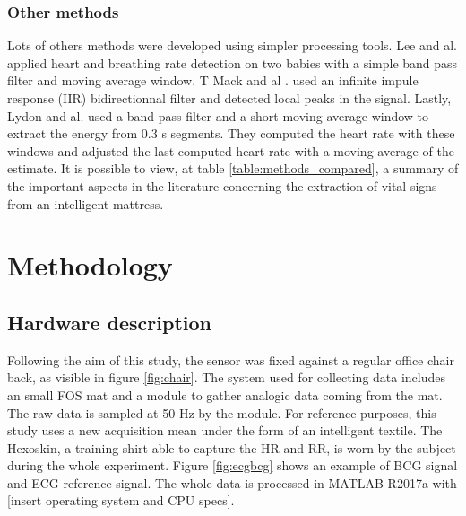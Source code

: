 \documentclass[twoside,twocolumn]{article}
\begin{document}
		\subsubsection{Other methods}
		Lots of others methods were developed using simpler processing tools. Lee and al. \cite{lee_ballistocardiogram_2015} applied heart and breathing rate detection on two babies with a simple band pass filter and moving average window. T
		Mack and al .\cite{mack_development_2009} used an infinite impule response (IIR) bidirectionnal filter and detected local peaks in the signal. 
		Lastly, Lydon and al. \cite{lydon_robust_2015} used a band pass filter and a short moving average window to extract the energy from 0.3 s segments. They computed the heart rate with these windows and adjusted the last computed heart rate with a moving average of the estimate. 
		It is possible to view, at table \ref{table:methods_compared}, a summary of the important aspects in the literature concerning the extraction of vital signs from an intelligent mattress. 

\section{Methodology}
\label{Section:Methodology}
	\subsection{Hardware description}
	\label{subsection:Methodology:HD}
		Following the aim of this study, the sensor was fixed against a regular office chair back, as visible in 	figure \ref{fig:chair}. The system used for collecting data includes an small FOS mat and a module to 	gather analogic data coming from the mat. The raw data is sampled at 50 Hz by the module. For reference purposes, this study uses a new acquisition mean under the form of an intelligent textile. The Hexoskin, a training shirt able to capture the HR and RR, is worn by the subject during the whole experiment. Figure \ref{fig:ecgbcg} shows an example of BCG signal and ECG reference signal. The whole data is processed in MATLAB R2017a with [insert operating system and CPU specs].
	
\end{document}
